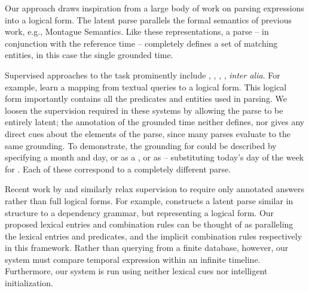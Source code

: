 Our approach draws inspiration from a large body of work
	on parsing expressions into a logical form.
The latent parse parallels the formal semantics of previous work,
	e.g., Montague Semantics.
Like these representations, a parse -- in conjunction with
	the reference time -- completely defines a set of
	matching entities, in this case the single grounded time.

Supervised approaches to the task prominently include
	,
	,
	, 
	, 
	\textit{inter alia}.
For example,  learn a mapping from
	textual queries to a logical form.
This logical form importantly contains all the predicates and entities
	used in parsing.
We loosen the supervision required in these systems by allowing the parse to
	be entirely latent;
	the annotation of the grounded time neither defines, nor gives any
	direct cues about the elements of the parse, since many parses evaluate
	to the same grounding.
To demonstrate, the grounding for  could be
	described by specifying a month and day, or as a , or as  -- substituting today's day of the week for .
Each of these correspond to a completely different parse.

Recent work by  and 
	 similarly relax supervision 
	to require only annotated answers rather than full logical forms.
For example,  constructs a latent parse
	similar in structure to a dependency grammar, but representing a logical
	form.
Our proposed lexical entries and combination rules can be thought of as
	paralleling the lexical entries and predicates, and the implicit combination 
	rules respectively in this framework.
Rather than querying from a finite database, however, our system must compare
	temporal expression within an infinite timeline.
Furthermore, our system is run using neither lexical cues nor intelligent
	initialization.

